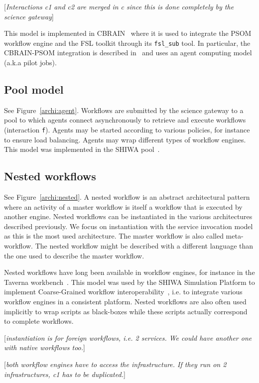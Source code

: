 \documentclass[preprint,3p,twocolumn]{elsarticle}
\newcommand{\todo}[1]{\color{blue}\xspace[\emph{#1}]\xspace\color{black}}
\begin{document}
\todo{Interactions c1 and c2 are merged in c since this is done
  completely by the science gateway}

This model is implemented in CBRAIN~\cite{SHER-14} where it is used to
integrate the PSOM workflow engine and the FSL toolkit through its
\texttt{fsl\_sub} tool. In particular, the CBRAIN-PSOM integration is
described in~\cite{GLAT-16} and uses an agent computing model (a.k.a pilot
jobs).

\subsection{Pool model}
\label{sec:pool}
See Figure~\ref{archi:agent}. Workflows are submitted by the science
gateway to a pool to which agents connect asynchronously to retrieve
and execute workflows (interaction \texttt{f}). Agents may be started according to various
policies, for instance to ensure load balancing. Agents may wrap
different types of workflow engines. This model was implemented in the
SHIWA pool~\cite{ROGE-13}.

\subsection{Nested workflows}

See Figure~\ref{archi:nested}. A nested workflow is an abstract
architectural pattern where an activity of a master workflow is itself
a workflow that is executed by another engine. Nested workflows can be
instantiated in the various architectures described previously. We
focus on instantiation with the service invocation model as this is
the most used architecture. The master workflow is also called
meta-workflow. The nested workflow might be described with a different
language than the one used to describe the master workflow.

Nested workflows have long been available in workflow engines, for
instance in the Taverna workbench~\cite{oinn2004taverna}. This model
was used by the SHIWA Simulation Platform to implement Coarse-Grained
workflow interoperability~\cite{terstyanszky2014enabling}, i.e. to
integrate various workflow engines in a consistent platform. Nested
workflows are also often used implicitly to wrap scripts as
black-boxes while these scripts actually correspond to complete workflows.

\todo{instantiation is for foreign workflows, i.e. 2 services. We could have another one with native workflows too.}

\todo{both workflow engines have to access the infrastructure. If they
  run on 2 infrastructures, c1 has to be duplicated.}
\end{document}
